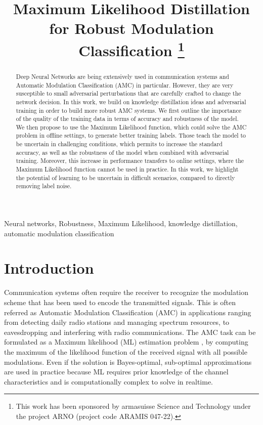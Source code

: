 \documentclass[conference]{IEEEtran}
\title{Maximum Likelihood Distillation for Robust Modulation Classification
\thanks{This work has been sponsored by armasuisse Science and Technology under the project ARNO (project code ARAMIS 047-22).}
}
\author{\IEEEauthorblockN{Javier Maroto}
\IEEEauthorblockA{\textit{Signal Processing Laboratory (LTS4)} \\ \textit{EPFL, Switzerland}}
\and
\IEEEauthorblockN{Gérôme Bovet}
\IEEEauthorblockA{\textit{armasuisse Science\&Technology} \\
\textit{Cyber-Defence Campus, Switzerland}}
\and
\IEEEauthorblockN{Pascal Frossard}
\IEEEauthorblockA{\textit{Signal Processing Laboratory (LTS4)} \\ \textit{EPFL, Switzerland}}}
\newcommand{\pf}[1]{{\textcolor{orange}{PF: {#1}}}}
\begin{document}
\maketitle

\begin{abstract}
Deep Neural Networks are being extensively used in communication systems and Automatic Modulation Classification (AMC) in particular. However, they are very susceptible to small adversarial perturbations that are carefully crafted to change the network decision. In this work, we build on knowledge distillation ideas and adversarial training in order to build more robust AMC systems. We first outline the importance of the quality of the training data in terms of accuracy and robustness of the model. We then propose to use the Maximum Likelihood function, which could solve the AMC problem in offline settings, to generate better training labels. Those teach the model to be uncertain in challenging conditions, which permits to increase the standard accuracy, as well as the robustness of the model when combined with adversarial training. Moreover, this increase in performance transfers to online settings, where the Maximum Likelihood function cannot be used in practice. In this work, we highlight the potential of learning to be uncertain in difficult scenarios, compared to directly removing label noise.
\end{abstract}

\begin{IEEEkeywords}
Neural networks, Robustness, Maximum Likelihood, knowledge distillation, automatic modulation classification
\end{IEEEkeywords}

\section{Introduction}

Communication systems often require the receiver to recognize the modulation scheme that has been used to encode the transmitted signals. This is often referred as Automatic Modulation Classification (AMC) in applications ranging from detecting daily radio stations and managing spectrum resources, to eavesdropping and interfering with radio communications. The AMC task can be formulated as a Maximum likelihood (ML) estimation problem \cite{huan1995likelihood,dobre2007survey,hameed2009likelihood}, by computing the maximum of the likelihood function of the received signal with all possible modulations. Even if the solution is Bayes-optimal, sub-optimal approximations are used in practice \cite{dobre2007survey,Hameed_Dobre_Popescu_2009} because ML requires prior knowledge of the channel characteristics and is computationally complex to solve in realtime.
\end{document}
